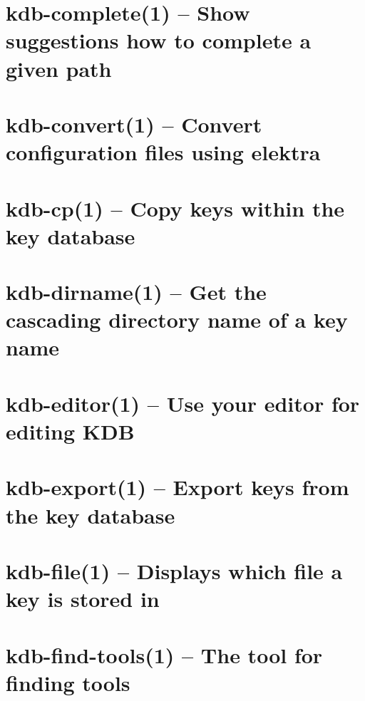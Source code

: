 \let\mypdfximage\pdfximage\def\pdfximage{\immediate\mypdfximage}\documentclass[twoside]{book}
\newcommand{\+}{\discretionary{\mbox{\scriptsize$\hookleftarrow$}}{}{}}
\begin{document}
\chapter{kdb-\/complete(1) -- Show suggestions how to complete a given path}
\label{doc_help_kdb-complete_md}

\chapter{kdb-\/convert(1) -- Convert configuration files using elektra}
\label{doc_help_kdb-convert_md}

\chapter{kdb-\/cp(1) -- Copy keys within the key database}
\label{doc_help_kdb-cp_md}

\chapter{kdb-\/dirname(1) -- Get the cascading directory name of a key name}
\label{doc_help_kdb-dirname_md}

\chapter{kdb-\/editor(1) -- Use your editor for editing KDB}
\label{doc_help_kdb-editor_md}

\chapter{kdb-\/export(1) -- Export keys from the key database}
\label{doc_help_kdb-export_md}

\chapter{kdb-\/file(1) -- Displays which file a key is stored in}
\label{doc_help_kdb-file_md}

\chapter{kdb-\/find-\/tools(1) -- The tool for finding tools}
\label{doc_help_kdb-find-tools_md}

\end{document}
